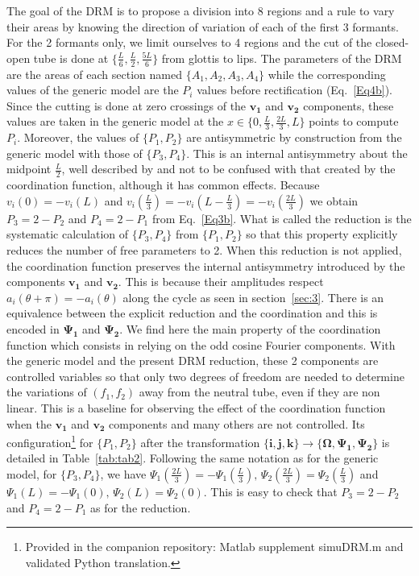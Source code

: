 \documentclass[10pt,twocolumn]{article}
\let\cite\citep                             %
\begin{document}
The goal of the DRM is to propose a division into 8 regions and a rule to vary their areas by knowing the direction of variation of each of the first 3 formants. For the 2 formants only, we limit ourselves to 4 regions and the cut of the closed-open tube is done at $\{\tfrac{L}{6},\tfrac{L}{2},\tfrac{5 L}{6}\}$ from glottis to lips. The parameters of the DRM are the areas of each section named $\{A_1,A_2,A_3,A_4\}$ while the corresponding values of the generic model are the $P_i$ values before rectification (Eq.~\ref{Eq4b}). Since the cutting is done at zero crossings of the $\bm{v_1}$ and $\bm{v_2}$ components, these values are taken in the generic model at the $x\in\{0,\tfrac{L}{3},\tfrac{2 L}{3},L\}$ points to compute $P_i$. Moreover, the values of $\{P_1,P_2\}$ are antisymmetric by construction from the generic model with those of $\{P_3,P_4\}$. This is an internal antisymmetry about the midpoint $\tfrac{L}{2}$, well described by \cite{Mrayati1988} and not to be confused with that created by the coordination function, although it has common effects. Because $v_i(0)=-v_i(L)$ and $v_i(\tfrac{L}{3})=-v_i(L-\tfrac{L}{3})=-v_i(\tfrac{2 L}{3})$ we obtain $P_3=2-P_2$ and $P_4=2-P_1$ from Eq.~\ref{Eq3b}. What is called the reduction is the systematic calculation of $\{P_3,P_4\}$ from $\{P_1,P_2\}$ so that this property explicitly reduces the number of free parameters to 2. When this reduction is not applied, the coordination function preserves the internal antisymmetry introduced by the components $\bm{v_1}$ and $\bm{v_2}$. This is because their amplitudes respect $a_i(\theta+\pi)=-a_i(\theta)$ along the cycle as seen in section~\ref{sec:3}. There is an equivalence between the explicit reduction and the coordination and this is encoded in $\bm{\Psi_1}$ and $\bm{\Psi_2}$. We find here the main property of the coordination function which consists in relying on the odd cosine Fourier components. With the generic model and the present DRM reduction, these 2 components are controlled variables so that only two degrees of freedom are needed to determine the variations of $(f_1,f_2)$ away from the neutral tube, even if they are non linear. This is a baseline for observing the effect of the coordination function when the $\bm{v_1}$ and $\bm{v_2}$ components and many others are not controlled. Its configuration\footnote{Provided in the companion repository: Matlab supplement \mbox{simuDRM.m} and validated Python translation.} for $\{P_1,P_2\}$ after the transformation $\{\bm{i},\bm{j}, \bm{k}\}\rightarrow\{\bm{\Omega},\bm{\Psi_1},\bm{\Psi_2}\}$ is detailed in Table~\ref{tab:tab2}. Following the same notation as for the generic model, for $\{P_3,P_4\}$, we have $\Psi_1(\tfrac{2 L}{3})=-\Psi_1(\tfrac{L}{3}),\,\Psi_2(\tfrac{2 L}{3})=\Psi_2(\tfrac{L}{3})$ and  $\Psi_1(L)=-\Psi_1(0),\,\Psi_2(L)=\Psi_2(0)$. This is easy to check that $P_3=2-P_2$ and $P_4=2-P_1$ as for the reduction.
\end{document}
